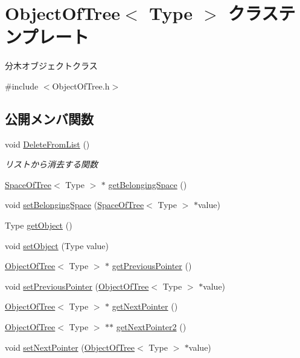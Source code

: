 \hypertarget{class_object_of_tree}{}\section{Object\+Of\+Tree$<$ Type $>$ クラステンプレート}
\label{class_object_of_tree}


分木オブジェクトクラス  




{\ttfamily \#include $<$Object\+Of\+Tree.\+h$>$}

\subsection*{公開メンバ関数}
\begin{DoxyCompactItemize}
\item 
void \mbox{\hyperlink{class_object_of_tree_a1356595b29749ca4555ca61a5bb30388}{Delete\+From\+List}} ()
\begin{DoxyCompactList}\small\item\em リストから消去する関数 \end{DoxyCompactList}\item 
\mbox{\hyperlink{class_space_of_tree}{Space\+Of\+Tree}}$<$ Type $>$ $\ast$ \mbox{\hyperlink{class_object_of_tree_a94c5724ddb841da0bb31ab6ae63df304}{get\+Belonging\+Space}} ()
\item 
void \mbox{\hyperlink{class_object_of_tree_a21dc9105d1a5a0d045dc43894bba3c1c}{set\+Belonging\+Space}} (\mbox{\hyperlink{class_space_of_tree}{Space\+Of\+Tree}}$<$ Type $>$ $\ast$value)
\item 
Type \mbox{\hyperlink{class_object_of_tree_a28214e15fffb72cb50b764e2f3ac863d}{get\+Object}} ()
\item 
void \mbox{\hyperlink{class_object_of_tree_aae14cb0e8ac8b701de737c547a1d3b8c}{set\+Object}} (Type value)
\item 
\mbox{\hyperlink{class_object_of_tree}{Object\+Of\+Tree}}$<$ Type $>$ $\ast$ \mbox{\hyperlink{class_object_of_tree_a02b74f20b90ec53dbae2d18648a9d5d1}{get\+Previous\+Pointer}} ()
\item 
void \mbox{\hyperlink{class_object_of_tree_aa0ec8f6f61eb41f346796141e8ec38d5}{set\+Previous\+Pointer}} (\mbox{\hyperlink{class_object_of_tree}{Object\+Of\+Tree}}$<$ Type $>$ $\ast$value)
\item 
\mbox{\hyperlink{class_object_of_tree}{Object\+Of\+Tree}}$<$ Type $>$ $\ast$ \mbox{\hyperlink{class_object_of_tree_a596be7ee8c6e26a104bed5d26f7cf54e}{get\+Next\+Pointer}} ()
\item 
\mbox{\hyperlink{class_object_of_tree}{Object\+Of\+Tree}}$<$ Type $>$ $\ast$$\ast$ \mbox{\hyperlink{class_object_of_tree_a1b5839c677aa3c678733c1aa03d4f00f}{get\+Next\+Pointer2}} ()
\item 
void \mbox{\hyperlink{class_object_of_tree_a44fb225ed189197bcdfe23dcd2a7fe28}{set\+Next\+Pointer}} (\mbox{\hyperlink{class_object_of_tree}{Object\+Of\+Tree}}$<$ Type $>$ $\ast$value)
\end{DoxyCompactItemize}
